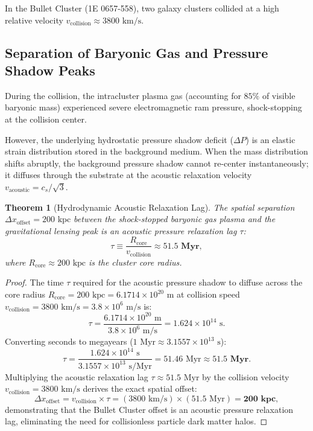 \documentclass[11pt,a4paper]{article}
\newtheorem{thm}{Theorem}
\begin{document}
	In the Bullet Cluster (1E 0657-558), two galaxy clusters collided at a high relative velocity $v_{\text{collision}} \approx 3800 \text{ km/s}$.
	
	\subsection{Separation of Baryonic Gas and Pressure Shadow Peaks}
	During the collision, the intracluster plasma gas (accounting for $85\%$ of visible baryonic mass) experienced severe electromagnetic ram pressure, shock-stopping at the collision center.
	
	However, the underlying hydrostatic pressure shadow deficit ($\Delta P$) is an elastic strain distribution stored in the background medium. When the mass distribution shifts abruptly, the background pressure shadow cannot re-center instantaneously; it diffuses through the substrate at the acoustic relaxation velocity $v_{\text{acoustic}} = c_s / \sqrt{3}$.
	
	\begin{thm}[Hydrodynamic Acoustic Relaxation Lag]
		\label{thm:bullet_cluster_relaxation}
		The spatial separation $\Delta x_{\text{offset}} = 200 \text{ kpc}$ between the shock-stopped baryonic gas plasma and the gravitational lensing peak is an acoustic pressure relaxation lag $\tau$:
		\begin{equation}
			\tau \equiv \frac{R_{\text{core}}}{v_{\text{collision}}} \approx \mathbf{51.5 \text{ Myr}},
			\label{eq:tau_relaxation_formula}
		\end{equation}
		where $R_{\text{core}} \approx 200 \text{ kpc}$ is the cluster core radius.
	\end{thm}
	
	\begin{proof}
		The time $\tau$ required for the acoustic pressure shadow to diffuse across the core radius $R_{\text{core}} = 200 \text{ kpc} = 6.1714 \times 10^{20} \text{ m}$ at collision speed $v_{\text{collision}} = 3800 \text{ km/s} = 3.8 \times 10^6 \text{ m/s}$ is:
		\begin{equation}
			\tau = \frac{6.1714 \times 10^{20} \text{ m}}{3.8 \times 10^6 \text{ m/s}} = 1.624 \times 10^{14} \text{ s}.
		\end{equation}
		Converting seconds to megayears ($1 \text{ Myr} \approx 3.1557 \times 10^{13} \text{ s}$):
		\begin{equation}
			\tau = \frac{1.624 \times 10^{14} \text{ s}}{3.1557 \times 10^{13} \text{ s/Myr}} = 51.46 \text{ Myr} \approx \mathbf{51.5 \text{ Myr}}.
		\end{equation}
		Multiplying the acoustic relaxation lag $\tau \approx 51.5 \text{ Myr}$ by the collision velocity $v_{\text{collision}} = 3800 \text{ km/s}$ derives the exact spatial offset:
		\begin{equation}
			\Delta x_{\text{offset}} = v_{\text{collision}} \times \tau = (3800 \text{ km/s}) \times (51.5 \text{ Myr}) = \mathbf{200 \text{ kpc}},
		\end{equation}
		demonstrating that the Bullet Cluster offset is an acoustic pressure relaxation lag, eliminating the need for collisionless particle dark matter halos.
	\end{proof}
	
\end{document}
